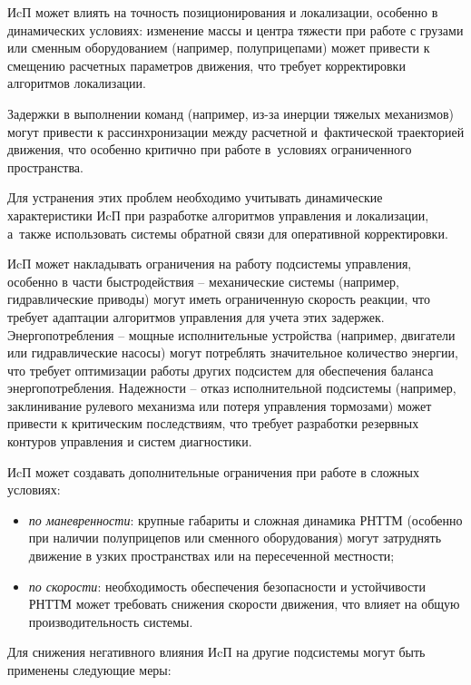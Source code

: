 ИcП может влиять на точность позиционирования и локализации, особенно в динамических условиях: изменение массы и центра тяжести при работе с грузами или сменным оборудованием (например, полуприцепами) может привести к смещению расчетных параметров движения, что требует корректировки алгоритмов локализации.

Задержки в выполнении команд (например, из-за инерции тяжелых механизмов) могут привести к рассинхронизации между расчетной и~фактической траекторией движения, что особенно критично при работе в~условиях ограниченного пространства.

Для устранения этих проблем необходимо учитывать динамические характеристики ИcП при разработке алгоритмов управления и локализации, а~также использовать системы обратной связи для оперативной корректировки.

ИcП может накладывать ограничения на работу подсистемы управления, особенно в части быстродействия -- механические системы (например, гидравлические приводы) могут иметь ограниченную скорость реакции, что требует адаптации алгоритмов управления для учета этих задержек. Энергопотребления -- мощные исполнительные устройства (например, двигатели или гидравлические насосы) могут потреблять значительное количество энергии, что требует оптимизации работы других подсистем для обеспечения баланса энергопотребления. Надежности -- отказ исполнительной подсистемы (например, заклинивание рулевого механизма или потеря управления тормозами) может привести к критическим последствиям, что требует разработки резервных контуров управления и систем диагностики.

ИcП может создавать дополнительные ограничения при работе в сложных условиях:

\begin{itemize}[beginpenalty=10000, midpenalty=10000, wide=\parindent, leftmargin=0pt]
	\item \textit{по маневренности}: крупные габариты и сложная динамика РНТТМ (особенно при наличии полуприцепов или сменного оборудования) могут затруднять движение в узких пространствах или на пересеченной местности;

	\item \textit{по скорости}: необходимость обеспечения безопасности и устойчивости РНТТМ может требовать снижения скорости движения, что влияет на общую производительность системы.
\end{itemize}

Для снижения негативного влияния ИcП на другие подсистемы могут быть применены следующие меры:

